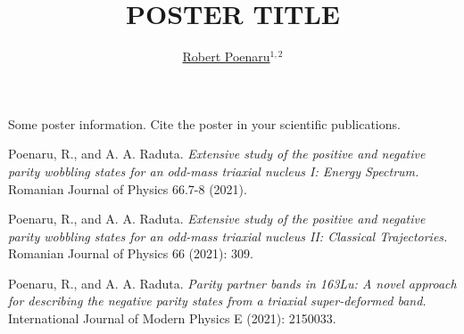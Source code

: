 ﻿\documentclass[a4paper,10pt,english]{article}
\begin{document}
\title{POSTER TITLE}


\author{\uline{Robert Poenaru}$^{1,2}$}

\maketitle

\address{$^{1}$Doctoral School of Physics, University of Bucharest, Bucharest, Romania}

\address{$^{2}$Department of Theoretical Physics, NIPNE-HH, Magurele, Romania}


Some poster information. Cite the poster in your scientific publications. \cite{poenaru_rjp1,poenaru_rjp2,poenaru_ijmpe}

\begin{thebibliography}{References}

 Poenaru, R., and A. A. Raduta. \textit{Extensive study of the positive and negative parity wobbling states for an odd-mass triaxial nucleus I: Energy Spectrum.} Romanian Journal of Physics 66.7-8 (2021).

 Poenaru, R., and A. A. Raduta. \textit{Extensive study of the positive and negative parity wobbling states for an odd-mass triaxial nucleus II: Classical Trajectories.} Romanian Journal of Physics 66 (2021): 309.

 Poenaru, R., and A. A. Raduta. \textit{Parity partner bands in 163Lu: A novel approach for describing the negative parity states from a triaxial super-deformed band.} International Journal of Modern Physics E (2021): 2150033.

\end{thebibliography}
\end{document}
